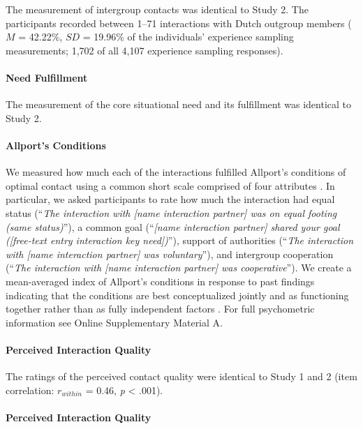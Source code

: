 The measurement of intergroup contacts was identical to Study 2. The
participants recorded between 1--71 interactions with Dutch outgroup
members (\(M\) = 42.22\%, \(SD\) = 19.96\% of the individuals'
experience sampling measurements; 1,702 of all 4,107 experience sampling
responses).

\paragraph{Need Fulfillment}

The measurement of the core situational need and its fulfillment was
identical to Study 2.

\paragraph{Allport's Conditions}

We measured how much each of the interactions fulfilled Allport's
conditions of optimal contact using a common short scale comprised of
four attributes \citep{Islam1993, Voci2003, AlRamiah2012a}. In
particular, we asked participants to rate how much the interaction had
equal status
(``\textit{The interaction with [name interaction partner] was on equal footing (same status)}''),
a common goal
(``\textit{[name interaction partner] shared your goal ([free-text entry interaction key need])}''),
support of authorities
(``\textit{The interaction with [name interaction partner] was voluntary}''),
and intergroup cooperation
(``\textit{The interaction with [name interaction partner] was cooperative}'').
We create a mean-averaged index of Allport's conditions in response to
past findings indicating that the conditions are best conceptualized
jointly and as functioning together rather than as fully independent
factors \citep[][, p. 766]{Pettigrew2006}. For full psychometric
information see Online Supplementary Material A.

\paragraph{Perceived Interaction Quality}

The ratings of the perceived contact quality were identical to Study 1
and 2 (item correlation: \(r_{within}\) = 0.46, \textit{p} \textless{}
.001).

\paragraph{Perceived Interaction Quality}

